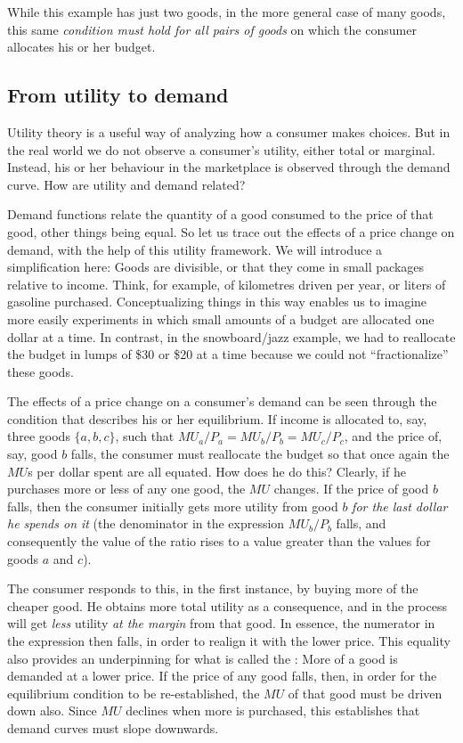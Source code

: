 While this example has just two goods, in the more general case of many
goods, this same \textit{condition must hold for all pairs of goods} on
which the consumer allocates his or her budget.

\newhtmlpage

\subsection*{From utility to demand}

Utility theory is a useful way of analyzing how a consumer makes choices.
But in the real world we do not observe a consumer's utility, either total
or marginal. Instead, his or her behaviour in the marketplace is observed
through the demand curve. How are utility and demand related?

Demand functions relate the quantity of a good consumed to the price of that
good, other things being equal. So let us trace out the effects of a price
change on demand, with the help of this utility framework. We will introduce
a simplification here: Goods are divisible, or that they come in small
packages relative to income. Think, for example, of kilometres driven per
year, or liters of gasoline purchased. Conceptualizing things in this way
enables us to imagine more easily experiments in which small amounts of a
budget are allocated one dollar at a time. In contrast, in the
snowboard/jazz example, we had to reallocate the budget in lumps of \$30 or
\$20 at a time because we could not ``fractionalize'' these goods.

The effects of a price change on a consumer's demand can be seen through the
condition that describes his or her equilibrium. If income is allocated to,
say, three goods $\{a, b, c\}$, such that $MU_a/P_a=MU_b/P_b=MU_c/P_c$, and
the price of, say, good $b$ falls, the consumer must reallocate the budget so
that once again the $MU$s per dollar spent are all equated. How does he do
this? Clearly, if he purchases more or less of any one good, the $MU$
changes. If the price of good $b$ falls, then the consumer initially gets more
utility from good $b$ \textit{for the last dollar he spends on it} (the
denominator in the expression $MU_b/P_b$ falls, and consequently the value
of the ratio rises to a value greater than the values for goods $a$ and $c$).

\newhtmlpage

The consumer responds to this, in the first instance, by buying more of the
cheaper good. He obtains more total utility as a consequence, and in the
process will get \textit{less} utility \textit{at the margin} from that
good. In essence, the numerator in the expression then falls, in order to
realign it with the lower price. This equality also provides an underpinning
for what is called the : More of a good is
demanded at a lower price. If the price of any good falls, then, in order
for the equilibrium condition to be re-established, the $MU$ of that good
must be driven down also. Since $MU$ declines when more is purchased, this
establishes that demand curves must slope downwards.

